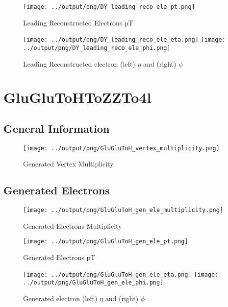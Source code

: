 \documentclass[11pt]{book}
\begin{document}
\begin{figure}[ht]
\centering
\texttt{[image: ../output/png/DY\_leading\_reco\_ele\_pt.png]}
\caption{Leading Reconstructed Electrons pT}
\label{fig:dy_leading_reco_ele_pt}
\end{figure}

\begin{figure}[ht]
\centering
\texttt{[image: ../output/png/DY\_leading\_reco\_ele\_eta.png]}
\texttt{[image: ../output/png/DY\_leading\_reco\_ele\_phi.png]}
\caption{Leading Reconstructed electron (left) $\eta$ and (right) $\phi$}
\label{fig:dy_leading_reco_ele_eta_phi}
\end{figure}
\clearpage

\chapter{GluGluToHToZZTo4l}
\section{General Information}

\begin{figure}[ht]
\centering
\texttt{[image: ../output/png/GluGluToH\_vertex\_multiplicity.png]}
\caption{Generated Vertex Multiplicity}
\label{fig:gluglu_vertex_multiplicity}
\end{figure}
\clearpage

\section{Generated Electrons}

\begin{figure}[ht]
\centering
\texttt{[image: ../output/png/GluGluToH\_gen\_ele\_multiplicity.png]}
\caption{Generated Electrons Multiplicity}
\label{fig:gluglu_gen_ele_multiplicity}
\end{figure}

\begin{figure}[ht]
\centering
\texttt{[image: ../output/png/GluGluToH\_gen\_ele\_pt.png]}
\caption{Generated Electrons pT}
\label{fig:gluglu_gen_ele_pt}
\end{figure}

\begin{figure}[ht]
\centering
\texttt{[image: ../output/png/GluGluToH\_gen\_ele\_eta.png]}
\texttt{[image: ../output/png/GluGluToH\_gen\_ele\_phi.png]}
\caption{Generated electron (left) $\eta$ and (right) $\phi$}
\label{fig:gluglu_gen_ele_eta_phi}
\end{figure}
\end{document}
